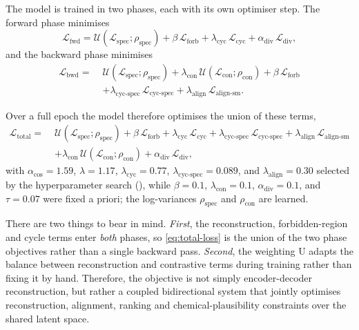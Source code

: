 The model is trained in two phases, each with its own optimiser step. The forward phase minimises
\begin{equation}
    \label{eq:loss-fwd}
    \mathcal{L}_{\mathrm{fwd}} = \mathcal{U}(\mathcal{L}_{\mathrm{spec}};\rho_{\mathrm{spec}}) + \beta\,\mathcal{L}_{\mathrm{forb}} + \lambda_{\mathrm{cyc}}\,\mathcal{L}_{\mathrm{cyc}} + \alpha_{\mathrm{div}}\,\mathcal{L}_{\mathrm{div}},
\end{equation}
and the backward phase minimises
\begin{equation}
    \label{eq:loss-bwd}
    \begin{aligned}
        \mathcal{L}_{\mathrm{bwd}} = \;& \mathcal{U}(\mathcal{L}_{\mathrm{spec}};\rho_{\mathrm{spec}}) + \lambda_{\mathrm{con}}\,\mathcal{U}(\mathcal{L}_{\mathrm{con}};\rho_{\mathrm{con}}) + \beta\,\mathcal{L}_{\mathrm{forb}} \\
        & + \lambda_{\text{cyc-spec}}\,\mathcal{L}_{\text{cyc-spec}} + \lambda_{\text{align}}\,\mathcal{L}_{\text{align-sm}}.
    \end{aligned}
\end{equation}

Over a full epoch the model therefore optimises the union of these terms,
\begin{equation}
    \label{eq:total-loss}
    \begin{aligned}
        \mathcal{L}_{\mathrm{total}} = \;& \mathcal{U}(\mathcal{L}_{\mathrm{spec}};\rho_{\mathrm{spec}}) + \beta\,\mathcal{L}_{\mathrm{forb}} + \lambda_{\mathrm{cyc}}\,\mathcal{L}_{\mathrm{cyc}} + \lambda_{\text{cyc-spec}}\,\mathcal{L}_{\text{cyc-spec}} + \lambda_{\text{align}}\,\mathcal{L}_{\text{align-sm}} \\
        & + \lambda_{\mathrm{con}}\,\mathcal{U}(\mathcal{L}_{\mathrm{con}};\rho_{\mathrm{con}}) + \alpha_{\mathrm{div}}\,\mathcal{L}_{\mathrm{div}},
    \end{aligned}
\end{equation}
with $\alpha_{\cos}=1.59$, $\lambda=1.17$, $\lambda_{\mathrm{cyc}}=0.77$, $\lambda_{\text{cyc-spec}}=0.089$, and $\lambda_{\text{align}}=0.30$ selected by the hyperparameter search (), while $\beta=0.1$, $\lambda_{\mathrm{con}}=0.1$, $\alpha_{\mathrm{div}}=0.1$, and $\tau=0.07$ were fixed a priori; the log-variances $\rho_{\mathrm{spec}}$ and $\rho_{\mathrm{con}}$ are learned.

There are two things to bear in mind.
\emph{First}, the reconstruction, forbidden-region and cycle terms enter \emph{both} phases, so \cref{eq:total-loss} is the union of the two phase objectives rather than a single backward pass.
\emph{Second}, the weighting U adapts the balance between reconstruction and contrastive terms during training rather than fixing it by hand.
Therefore, the objective is not simply encoder-decoder reconstruction, but rather a coupled bidirectional system that jointly optimises reconstruction, alignment, ranking and chemical-plausibility constraints over the shared latent space.

